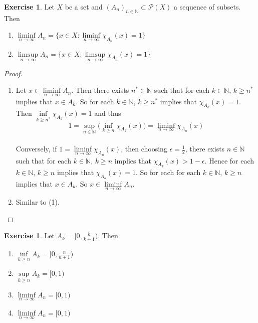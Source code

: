 \documentclass[12pt]{amsart}
\theoremstyle{definition}
\newtheorem{ex}[definition]{Exercise}
\newcommand{\ep}{\epsilon}
\newcommand{\N}{\mathbb{N}}
\newcommand{\MP}{\mathcal{P}}
\newcommand{\lex}[1]{\label{ex:#1}}
\begin{document}
	\begin{ex} \lex{00000} 
		Let $X$ be a set and $(A_n)_{n \in \N} \subset \MP(X)$ a sequence of subsets. Then 
		\begin{enumerate}
			\item $\liminf\limits_{n \rightarrow \infty}A_n = \bigg \{x \in X: \liminf\limits_{n \rightarrow \infty}\chi_{A_n}(x) = 1\bigg\}$
			\item $\limsup\limits_{n \rightarrow \infty}A_n = \bigg \{x \in X: \limsup\limits_{n \rightarrow \infty}\chi_{A_n}(x) = 1\bigg\}$
		\end{enumerate}
	\end{ex}
	
	\begin{proof}\
		\begin{enumerate}
			\item Let $x \in \liminf\limits_{n \rightarrow \infty}A_n$. Then there exists $n^* \in \N$ such that for each $k \in \N$, $k \geq n^*$ implies that $x \in A_k$. So for each $k \in \N$, $k \geq n^*$ implies that $\chi_{A_k}(x) = 1$. Then $\inf\limits_{k \geq n^*}\chi_{A_k}(x) = 1$ and thus $$1 = \sup\limits_{n \in \N} \bigg(\inf\limits_{k \geq n} \chi_{A_k}(x) \bigg) = \liminf_{n \rightarrow \infty}\chi_{A_n}(x)$$ \vspace{3mm} \\
			Conversely, if $1 = \liminf\limits_{n \rightarrow \infty}\chi_{A_n}(x)$, then choosing $\ep = \frac{1}{2}$, there exists $n \in \N$ such that for each $k \in \N$, $k \geq n$ implies that $\chi_{A_k}(x) > 1-\ep$. Hence for each $k \in \N$, $k \geq n$ implies that $\chi_{A_k}(x) = 1$. So for each for each $k \in \N$, $k \geq n$ implies that $x \in A_k$. So $x \in \liminf\limits_{n \rightarrow \infty} A_n$. 
			\item Similar to (1).
		\end{enumerate}
	\end{proof}
	
	\begin{ex} \lex{00000} 
		Let $A_k = [0, \frac{k}{k+1})$. Then 
		\begin{enumerate}
			\item $\inf\limits_{k \geq n}A_k = [0, \frac{n}{n+1})$ \\
			\item $\sup\limits_{k \geq n}A_k = [0,1)$ \\
			\item $\liminf\limits_{n \rightarrow \infty}A_n = [0,1)$ \\
			\item $\liminf\limits_{n \rightarrow \infty}A_n = [0,1)$
		\end{enumerate}
	\end{ex}
	
\end{document}
